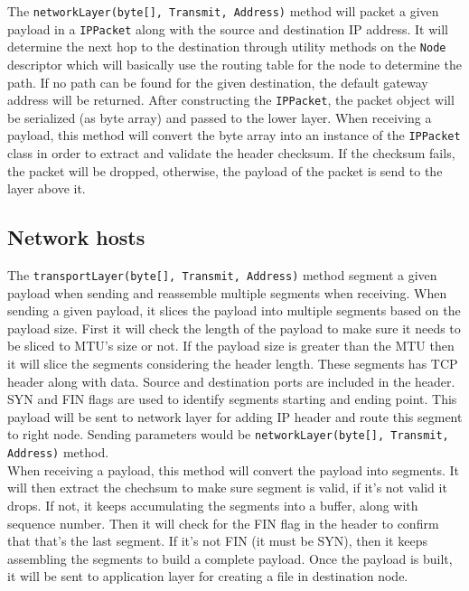\documentclass{scrartcl}
\begin{document}
The \texttt{networkLayer(byte[], Transmit, Address)} method will packet a given payload in a \texttt{IPPacket} along with the source and destination IP address. It will determine the next hop to the destination through utility methods on the \texttt{Node} descriptor which will basically use the routing table for the node to determine the path. If no path can be found for the given destination, the default gateway address will be returned. After constructing the \texttt{IPPacket}, the packet object will be serialized (as byte array) and passed to the lower layer. When receiving a payload, this method will convert the byte array into an instance of the \texttt{IPPacket} class in order to extract and validate the header checksum. If the checksum fails, the packet will be dropped, otherwise, the payload of the packet is send to the layer above it.

\subsection{Network hosts}
The \texttt{transportLayer(byte[], Transmit, Address)} method segment a given payload when sending and reassemble multiple segments when receiving. When sending a given payload, it slices the payload into multiple segments based on the payload size. First it will check the length of the payload to make sure it needs to be sliced to MTU's size or not. If the payload size is greater than the MTU then it will slice the segments considering the header length. These segments has TCP header along with data. Source and destination ports are included in the header. SYN and FIN flags are used to identify segments starting and ending point. This payload will be sent to network layer for adding IP header and route this segment to right node. Sending parameters would be \texttt{networkLayer(byte[], Transmit, Address)} method. \\

When receiving a payload, this method will convert the payload into segments. It will then extract the chechsum to make sure segment is valid, if it's not valid it drops. If not, it keeps accumulating the segments into a buffer, along with sequence number. Then it will check for the FIN flag in the header to confirm that that's the last segment. If it's not FIN (it must be SYN), then it keeps assembling the segments to build a complete payload. Once the payload is built, it will be sent to application layer for creating a file in destination node.
\end{document}
